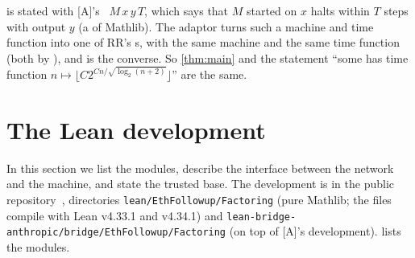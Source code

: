 \documentclass[10pt]{amsart}
\theoremstyle{plain}
\theoremstyle{definition}
\theoremstyle{remark}
\numberwithin{equation}{section}
\newcommand{\A}{\textup{[A]}}
\begin{document}
 is stated with \A's ~$M\,x\,y\,T$, which says that $M$
started on $x$ halts within $T$ steps with output $y$ (a  of Mathlib). The adaptor
 turns such a machine and time function into one of RR's
s, with the same machine and the same time function (both by ), and
 is the converse. So \cref{thm:main} and the statement ``some
 has time function $n\mapsto\lfloor C2^{Cn/\sqrt{\log_2(n+2)}}\rfloor$'' are the same.

\section{The Lean development}\label{sec:formal}

In this section we list the modules, describe the interface between the network and the machine, and
state the trusted base. The development is in the public repository~\cite{TulsyanRepo26}, directories
\texttt{lean/EthFollowup/Factoring} (pure Mathlib; the files compile with Lean v4.33.1 and v4.34.1)
and \texttt{lean-bridge-anthropic/bridge/EthFollowup/Factoring} (on top of \A's development).
 lists the modules.
\end{document}
